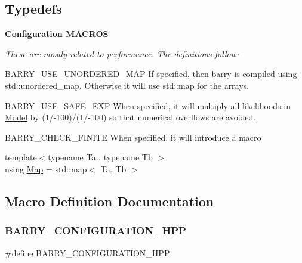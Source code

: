 \subsection*{Typedefs}
\begin{Indent}\textbf{ Configuration M\+A\+C\+R\+OS}\par
{\em These are mostly related to performance. The definitions follow\+:


\begin{DoxyItemize}
\item {\ttfamily B\+A\+R\+R\+Y\+\_\+\+U\+S\+E\+\_\+\+U\+N\+O\+R\+D\+E\+R\+E\+D\+\_\+\+M\+AP} If specified, then barry is compiled using {\ttfamily std\+::unordered\+\_\+map}. Otherwise it will use {\ttfamily std\+::map} for the arrays.
\item {\ttfamily B\+A\+R\+R\+Y\+\_\+\+U\+S\+E\+\_\+\+S\+A\+F\+E\+\_\+\+E\+XP} When specified, it will multiply all likelihoods in {\ttfamily \hyperlink{class_model}{Model}} by (1/-\/100)/(1/-\/100) so that numerical overflows are avoided.
\item {\ttfamily B\+A\+R\+R\+Y\+\_\+\+C\+H\+E\+C\+K\+\_\+\+F\+I\+N\+I\+TE} When specified, it will introduce a macro 
\end{DoxyItemize}}\begin{DoxyCompactItemize}
\item 
{\footnotesize template$<$typename Ta , typename Tb $>$ }\\using \hyperlink{barry-configuration_8hpp_a1bb64c776ba5e9fc373665103b1a1772}{Map} = std\+::map$<$ Ta, Tb $>$
\end{DoxyCompactItemize}
\end{Indent}


\subsection{Macro Definition Documentation}
\mbox{\label{barry_8hpp_a62a616299801c1da9d3639e85fdeff04}} 
\subsubsection{\texorpdfstring{B\+A\+R\+R\+Y\+\_\+\+C\+O\+N\+F\+I\+G\+U\+R\+A\+T\+I\+O\+N\+\_\+\+H\+PP}{BARRY\_CONFIGURATION\_HPP}}
{\footnotesize\ttfamily \#define B\+A\+R\+R\+Y\+\_\+\+C\+O\+N\+F\+I\+G\+U\+R\+A\+T\+I\+O\+N\+\_\+\+H\+PP}



